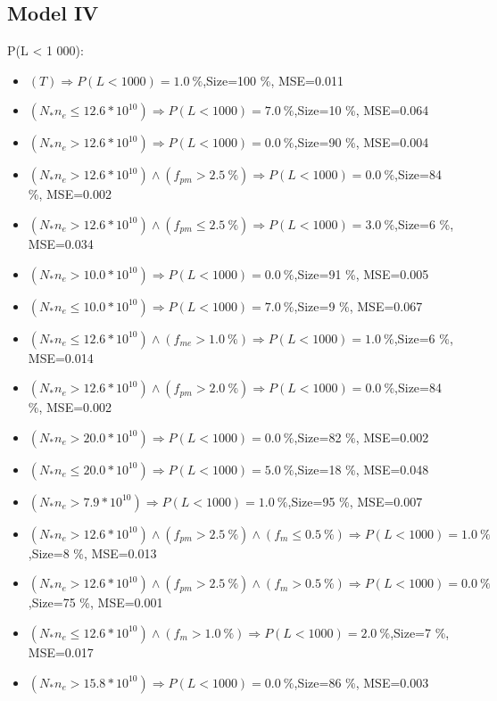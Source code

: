 \documentclass[numbered]{CSL}
\begin{document}
\subsection{Model IV}
P(L < 1 000):
\begin{itemize}
\item $(T) \Rightarrow P(L < 1 000) = 1.0~\%$,\hfill Size=100 \%, MSE=0.011
\item $(N_* n_e \leq 12.6 * 10^{10}) \Rightarrow P(L < 1 000) = 7.0~\%$,\hfill Size=10 \%, MSE=0.064
\item $(N_* n_e > 12.6 * 10^{10}) \Rightarrow P(L < 1 000) = 0.0~\%$,\hfill Size=90 \%, MSE=0.004
\item $(N_* n_e > 12.6 * 10^{10}) \land (f_{pm} > 2.5~\%) \Rightarrow P(L < 1 000) = 0.0~\%$,\hfill Size=84 \%, MSE=0.002
\item $(N_* n_e > 12.6 * 10^{10}) \land (f_{pm} \leq 2.5~\%) \Rightarrow P(L < 1 000) = 3.0~\%$,\hfill Size=6 \%, MSE=0.034
\item $(N_* n_e > 10.0 * 10^{10}) \Rightarrow P(L < 1 000) = 0.0~\%$,\hfill Size=91 \%, MSE=0.005
\item $(N_* n_e \leq 10.0 * 10^{10}) \Rightarrow P(L < 1 000) = 7.0~\%$,\hfill Size=9 \%, MSE=0.067
\item $(N_* n_e \leq 12.6 * 10^{10}) \land (f_{me} > 1.0~\%) \Rightarrow P(L < 1 000) = 1.0~\%$,\hfill Size=6 \%, MSE=0.014
\item $(N_* n_e > 12.6 * 10^{10}) \land (f_{pm} > 2.0~\%) \Rightarrow P(L < 1 000) = 0.0~\%$,\hfill Size=84 \%, MSE=0.002
\item $(N_* n_e > 20.0 * 10^{10}) \Rightarrow P(L < 1 000) = 0.0~\%$,\hfill Size=82 \%, MSE=0.002
\item $(N_* n_e \leq 20.0 * 10^{10}) \Rightarrow P(L < 1 000) = 5.0~\%$,\hfill Size=18 \%, MSE=0.048
\item $(N_* n_e > 7.9 * 10^{10}) \Rightarrow P(L < 1 000) = 1.0~\%$,\hfill Size=95 \%, MSE=0.007
\item $(N_* n_e > 12.6 * 10^{10}) \land (f_{pm} > 2.5~\%) \land (f_m \leq 0.5~\%) \Rightarrow P(L < 1 000) = 1.0~\%$,\hfill Size=8 \%, MSE=0.013
\item $(N_* n_e > 12.6 * 10^{10}) \land (f_{pm} > 2.5~\%) \land (f_m > 0.5~\%) \Rightarrow P(L < 1 000) = 0.0~\%$,\hfill Size=75 \%, MSE=0.001
\item $(N_* n_e \leq 12.6 * 10^{10}) \land (f_m > 1.0~\%) \Rightarrow P(L < 1 000) = 2.0~\%$,\hfill Size=7 \%, MSE=0.017
\item $(N_* n_e > 15.8 * 10^{10}) \Rightarrow P(L < 1 000) = 0.0~\%$,\hfill Size=86 \%, MSE=0.003

\end{itemize}
\end{document}
